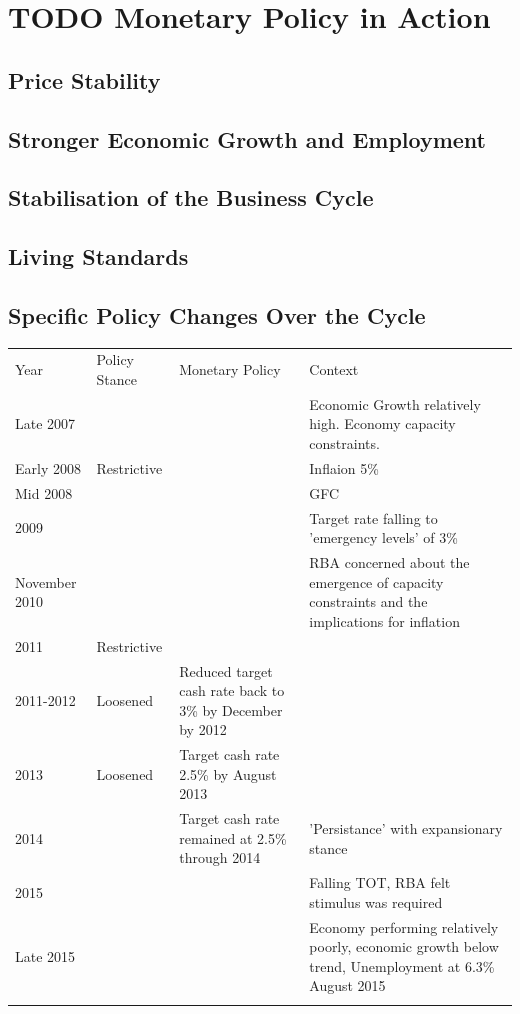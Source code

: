 \documentclass[11pt]{article}
\begin{document}
\section{{\bfseries\sffamily TODO} Monetary Policy in Action}
\label{sec-4}

\subsection{Price Stability}
\label{sec-4-1}

\subsection{Stronger Economic Growth and Employment}
\label{sec-4-2}

\subsection{Stabilisation of the Business Cycle}
\label{sec-4-3}

\subsection{Living Standards}
\label{sec-4-4}

\subsection{Specific Policy Changes Over the Cycle}
\label{sec-4-5}

\begin{center}
\begin{tabular}{llll}
Year & Policy Stance & Monetary Policy & Context\\
Late 2007 &  &  & Economic Growth relatively high. Economy capacity constraints.\\
Early 2008 & Restrictive &  & Inflaion 5\%\\
Mid 2008 &  &  & GFC\\
2009 &  &  & Target rate falling to 'emergency levels' of 3\%\\
November 2010 &  &  & RBA concerned about the emergence of capacity constraints and the implications for inflation\\
2011 & Restrictive &  & \\
2011-2012 & Loosened & Reduced target cash rate back to 3\% by December by 2012 & \\
2013 & Loosened & Target cash rate 2.5\% by August 2013 & \\
2014 &  & Target cash rate remained at 2.5\% through 2014 & 'Persistance' with expansionary stance\\
2015 &  &  & Falling TOT, RBA felt stimulus was required\\
Late 2015 &  &  & Economy performing relatively poorly, economic growth below trend, Unemployment at 6.3\% August 2015\\
 &  &  & \\
\end{tabular}
\end{center}
\end{document}
